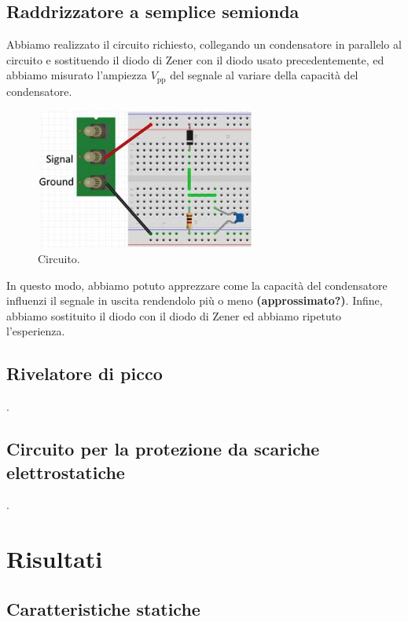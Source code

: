 \documentclass[a4paper]{article}
\begin{document}
{{		\subsection{Raddrizzatore a semplice semionda}
			Abbiamo realizzato il circuito richiesto, collegando un condensatore in parallelo al circuito e sostituendo il diodo di Zener con il diodo usato precedentemente, ed abbiamo misurato l'ampiezza $ V_{\mathrm{pp}} $ del segnale al variare della capacità del condensatore.
			\begin{figure}[h!]
				\centering
				\includegraphics[scale=0.7]{circuitoRaddrizzatoreASempliceSemionda}
				\caption{Circuito.}
				\label{fig:circuitoRaddrizzatoreASempliceSemionda}
			\end{figure}
			\newline
			In questo modo, abbiamo potuto apprezzare come la capacità del condensatore influenzi il segnale in uscita rendendolo più o meno \textbf{(approssimato?)}.
			Infine, abbiamo sostituito il diodo con il diodo di Zener ed abbiamo ripetuto l'esperienza.
		\subsection{Rivelatore di picco}
			.
		\subsection{Circuito per la protezione da scariche elettrostatiche}
			.
	\section{Risultati}
		\subsection{Caratteristiche statiche}
}}
\end{document}
